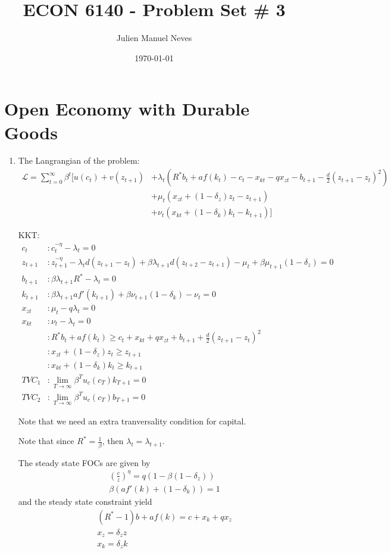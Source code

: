 \documentclass[12pt]{article}
\title{ECON 6140 - Problem Set \# 3}
\date{\today}
\author{Julien Manuel Neves}
\newcommand{\1}{{\bf 1}} %
\begin{document}
\maketitle

\section*{Open Economy with Durable Goods}

\begin{enumerate}[(1)]
	\item 
	
	The Langrangian of the problem:
	\begin{align*}
	\mathcal{L} = \sum_{t=0}^{\infty}\beta^t[u(c_t)+v(z_{t+1}) &+\lambda_t(R^*b_t+af(k_t)-c_t-x_{kt}-qx_{zt}-b_{t+1}-\frac{d}{2}(z_{t+1}-z_t)^2) \\
	&+\mu_t(x_{zt}+(1-\delta_z)z_t-z_{t+1})\\
	&+\nu_t(x_{kt}+(1-\delta_k)k_t-k_{t+1}) ]
	\end{align*}
	
	KKT:
	\begin{align*}
	c_{t}&: c_t^{-\eta}-\lambda_t=0\\
	z_{t+1}&:z_{t+1}^{-\eta}-\lambda_td(z_{t+1}-z_t)+\beta \lambda_{t+1}d(z_{t+2}-z_{t+1})-\mu_t+ \beta \mu_{t+1} (1-\delta_z) =0\\
	b_{t+1}&: \beta \lambda_{t+1}R^* - \lambda_t =0\\
	k_{t+1}&:\beta \lambda_{t+1} a f'(k_{t+1}) + \beta \nu_{t+1}(1-\delta_k) -\nu_t=0 \\
	x_{zt}&:\mu_t-q\lambda_t  =0 \\
	x_{kt}&:\nu_t-\lambda_t  =0\\
	&:R^*b_t+af(k_t)\geq c_t+x_{kt}+qx_{zt}+b_{t+1}+\frac{d}{2}(z_{t+1}-z_t)^2\\
	&:x_{zt}+(1-\delta_z)z_t\geq z_{t+1}\\
	&:x_{kt}+(1-\delta_k)k_t\geq k_{t+1}\\
	TVC_1&:\lim_{T\to \infty}\beta^Tu_c(c_T)k_{T+1}  =0\\
	TVC_2&:\lim_{T\to \infty}\beta^Tu_c(c_T)b_{T+1}  =0
	\end{align*}
	
	Note that we need an extra tranversality condition for capital.
	
	
	Note that since $R^*=\frac{1}{\beta}$, then $\lambda_t = \lambda_{t+1}$.
	
	The steady state FOCs are given by
			\begin{align*}
	&\left( \frac{c}{z}\right) ^{\eta} = q(1-\beta(1-\delta_z))\\
	&\beta(af'(k)+(1-\delta_k))=1
	\end{align*}
	and the steady state constraint yield
		\begin{align*}
	&(R^*-1)b+af(k)= c+x_{k}+qx_{z}\\
	&x_{z}=\delta_zz\\
	&x_{k}= \delta_zk
	\end{align*}


\end{enumerate}
\end{document}
